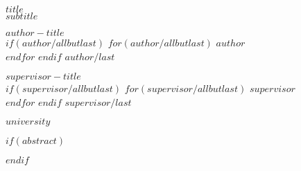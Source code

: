\begin{titlepage}
  \begin{center}
    \vspace*{2cm}
    
    {\textsf{\textbf{\Huge $title$}}}\\
    \vspace{0.3cm}
    \textsf{\textit{\large $subtitle$}}
    
    \vspace{1cm}
    \begin{multicols}{2}
      \begin{flushleft}
        \textsf{\textbf{$author-title$}\normalsize}\\
        $if(author/allbutlast)$
          $for(author/allbutlast)$
            \textsf{$author$}\\
          $endfor$
        $endif$
        \textsf{$author/last$}\\
      \end{flushleft}

      \vfill\null
      \columnbreak

      \begin{flushright}
        \textsf{\textbf{$supervisor-title$}\normalsize}\\
        $if(supervisor/allbutlast)$
          $for(supervisor/allbutlast)$
            \textsf{$supervisor$}\\
          $endfor$
        $endif$
        \textsf{$supervisor/last$}

      \end{flushright}
    \end{multicols}
    \vfill
    \textsf{$university$}
  \end{center}
  \normalfont
\end{titlepage}


$if(abstract)$
\begin{abstract}
$abstract$
\end{abstract}
$endif$
